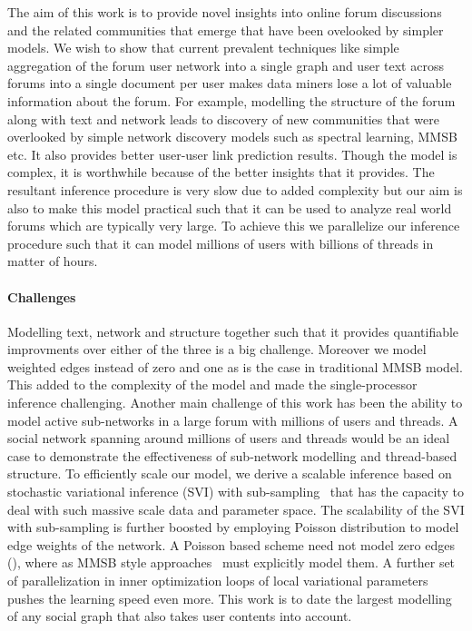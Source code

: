 \documentclass{sig-alternate}
\begin{document}
The aim of this work is to provide novel insights into online forum discussions
and the related communities that emerge that have been ovelooked 
by simpler models. We wish to show that current prevalent techniques like 
simple aggregation of the forum user network into a single graph and user 
text across forums into a single document per user makes data miners 
lose a lot of valuable information about the forum. For example, 
modelling the structure of the forum along with text and network 
leads to discovery of new communities that were overlooked by simple
network discovery models such as spectral learning, MMSB etc. It also 
provides better user-user link prediction results. Though the  
model is complex, it is worthwhile because of the better insights that 
it provides. The resultant inference procedure is very slow due to added
complexity but our aim is also to make this model 
practical such that it can be used to analyze 
real world forums which are typically very large. To achieve this we 
parallelize our inference procedure such that it can model millions of
users with billions of threads in matter of hours.

\vspace*{-0.5\baselineskip}
\paragraph{Challenges} Modelling text, network and 
structure together such that it provides
quantifiable improvments over either of the three is a big challenge.
Moreover we model weighted edges instead of zero and one 
as is the case in traditional MMSB model. This added to the 
complexity of the model and made the single-processor inference challenging.
Another main challenge of this work has been the ability to model
active sub-networks in a large forum with millions of users and
threads. A social network spanning around millions of users and threads would 
be an ideal case to demonstrate the effectiveness of sub-network
modelling and thread-based structure.
To efficiently scale our model, we derive a scalable inference based on
stochastic variational inference (SVI) with sub-sampling~\cite{Hoffman:2013:SVI} 
that has the capacity to deal with such massive scale data and parameter space.
 The scalability of the SVI
with sub-sampling is further boosted by employing Poisson distribution 
to model edge weights of
the network. A Poisson based scheme need not model zero edges
(\cite{Kerrer:Newman}), where as MMSB style approaches~\cite{Airoldi:2008:MMS:1390681.1442798}
 must explicitly model them.
A further set of
parallelization in inner optimization loops of local variational parameters
pushes the learning speed even more. This work is to date the largest 
modelling of any social graph that also takes user contents into
account. 
\end{document}
